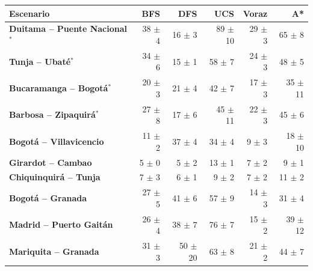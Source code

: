 \renewcommand{\arraystretch}{1.2}
\begin{tabular}{|l|r|r|r|r|r|}
\hline
\rowcolor{gray!20} \textbf{Escenario} & \textbf{BFS} & \textbf{DFS} & \textbf{UCS} & \textbf{Voraz} & \textbf{A*} \\
\hline
\textbf{Duitama -- Puente Nacional$^{*}$} & 38 $\pm$ 4 & 16 $\pm$ 3 & 89 $\pm$ 10 & 29 $\pm$ 3 & 65 $\pm$ 8 \\
\hline
\textbf{Tunja -- Ubaté$^{*}$} & 34 $\pm$ 6 & 15 $\pm$ 1 & 58 $\pm$ 7 & 24 $\pm$ 3 & 48 $\pm$ 5 \\
\hline
\textbf{Bucaramanga -- Bogotá$^{*}$} & 20 $\pm$ 3 & 21 $\pm$ 4 & 42 $\pm$ 7 & 17 $\pm$ 3 & 35 $\pm$ 11 \\
\hline
\textbf{Barbosa -- Zipaquirá$^{*}$} & 27 $\pm$ 8 & 17 $\pm$ 6 & 45 $\pm$ 11 & 22 $\pm$ 3 & 45 $\pm$ 6 \\
\hline
\textbf{Bogotá -- Villavicencio} & 11 $\pm$ 2 & 37 $\pm$ 4 & 34 $\pm$ 4 & 9 $\pm$ 3 & 18 $\pm$ 10 \\
\hline
\textbf{Girardot -- Cambao} & 5 $\pm$ 0 & 5 $\pm$ 2 & 13 $\pm$ 1 & 7 $\pm$ 2 & 9 $\pm$ 1 \\
\hline
\textbf{Chiquinquirá -- Tunja} & 7 $\pm$ 3 & 6 $\pm$ 1 & 9 $\pm$ 2 & 7 $\pm$ 2 & 11 $\pm$ 2 \\
\hline
\textbf{Bogotá -- Granada} & 27 $\pm$ 5 & 41 $\pm$ 6 & 57 $\pm$ 9 & 14 $\pm$ 3 & 31 $\pm$ 4 \\
\hline
\textbf{Madrid -- Puerto Gaitán} & 26 $\pm$ 4 & 38 $\pm$ 7 & 76 $\pm$ 7 & 15 $\pm$ 2 & 39 $\pm$ 12 \\
\hline
\textbf{Mariquita -- Granada} & 31 $\pm$ 3 & 50 $\pm$ 20 & 63 $\pm$ 8 & 21 $\pm$ 2 & 44 $\pm$ 7 \\
\hline
\end{tabular}
